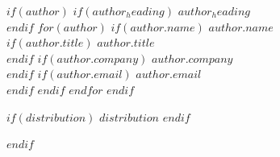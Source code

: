 \documentclass[
    $if(fontsize)$$fontsize$$else$10pt$endif$,
    $if(papersize)$$papersize$$else$letterpaper$endif$,
    titlepage,
    oneside,
    openright,
    $if(is_draft)$draft$else$final$endif$,
    article]{memoir}
\begin{document}
\begin{flushright}
        \vspace*{1.75in}
        $if(author)$
            $if(author_heading)$
                {\fontsize{12pt}{14pt}\textrm{$author_heading$}}\\[1em]
            $endif$
            $for(author)$
                $if(author.name)$
                    \vspace*{1.4em}
                    {\fontsize{12pt}{14pt}\textbf{$author.name$}}\\[0.2em]
                    $if(author.title)$
                        {\fontsize{11pt}{13pt}\textrm{$author.title$}}\\[0.2em]
                    $endif$
                    $if(author.company)$
                        {\fontsize{11pt}{13pt}\textrm{$author.company$}}\\[0.2em]
                    $endif$
                    $if(author.email)$
                        {\fontsize{11pt}{13pt}\textrm{$author.email$}}\\
                    $endif$
                $endif$
            $endfor$
        $endif$

        \vspace{\fill}
        $if(distribution)$
            {\fontsize{10pt}{13pt}\textrm{$distribution$}}
        $endif$
    \end{flushright}
$endif$



\frontmatter
\end{document}
